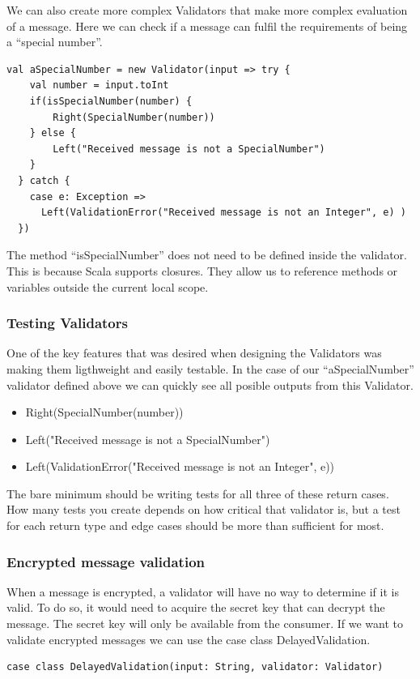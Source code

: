 We can also create more complex Validators that make more complex evaluation of a message. Here we can check if a message can fulfil the requirements of being a ``special number''.
\begin{lstlisting}[style=myScalastyle]
  val aSpecialNumber = new Validator(input => try {
    val number = input.toInt
    if(isSpecialNumber(number) {
        Right(SpecialNumber(number))
    } else {
        Left("Received message is not a SpecialNumber") 
    }
  } catch {
    case e: Exception =>
      Left(ValidationError("Received message is not an Integer", e) )
  })
\end{lstlisting}
The method ``isSpecialNumber'' does not need to be defined inside the validator. This is because Scala supports closures. They allow us to reference methods or variables outside the current local scope.

\subsubsection{Testing Validators}
One of the key features that was desired when designing the Validators was making them ligthweight and easily testable. In the case of our ``aSpecialNumber'' validator defined above we can quickly see all posible outputs from this Validator.
\begin{itemize}
  \item Right(SpecialNumber(number))
  \item Left("Received message is not a SpecialNumber") 
  \item Left(ValidationError("Received message is not an Integer", e))
\end{itemize}
The bare minimum should be writing tests for all three of these return cases. How many tests you create depends on how critical that validator is, but a test for each return type and edge cases should be more than sufficient for most.

\subsubsection{Encrypted  message validation}
When a message is encrypted, a validator will have no way to determine if it is valid. To do so, it would need to acquire the secret key that can decrypt the message. The secret key will only be available from the consumer. If we want to validate encrypted messages we can use the case class DelayedValidation.
 
\begin{lstlisting}[style=myScalastyle]
case class DelayedValidation(input: String, validator: Validator)
\end{lstlisting}

